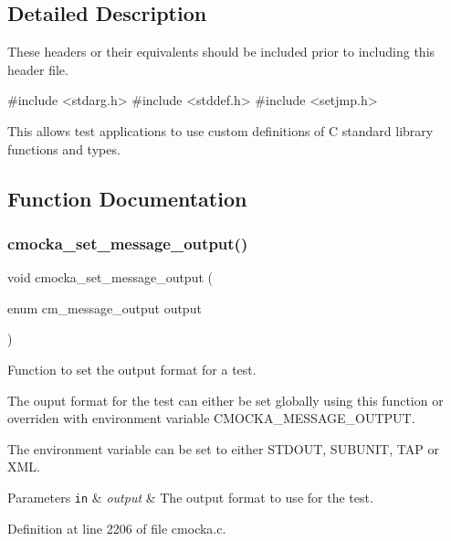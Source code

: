 \subsection{Detailed Description}
These headers or their equivalents should be included prior to including this header file. 
\begin{DoxyCode}
\textcolor{preprocessor}{#include <stdarg.h>}
\textcolor{preprocessor}{#include <stddef.h>}
\textcolor{preprocessor}{#include <setjmp.h>}
\end{DoxyCode}


This allows test applications to use custom definitions of C standard library functions and types. 

\subsection{Function Documentation}
\mbox{\label{group__cmocka_gae3764f4f38d067fe9c5faf034c07debd}} 
\subsubsection{\texorpdfstring{cmocka\+\_\+set\+\_\+message\+\_\+output()}{cmocka\_set\_message\_output()}}
{\footnotesize\ttfamily void cmocka\+\_\+set\+\_\+message\+\_\+output (\begin{DoxyParamCaption}\item[{enum cm\+\_\+message\+\_\+output}]{output }\end{DoxyParamCaption})}



Function to set the output format for a test. 

The ouput format for the test can either be set globally using this function or overriden with environment variable C\+M\+O\+C\+K\+A\+\_\+\+M\+E\+S\+S\+A\+G\+E\+\_\+\+O\+U\+T\+P\+UT.

The environment variable can be set to either S\+T\+D\+O\+UT, S\+U\+B\+U\+N\+IT, T\+AP or X\+ML.


\begin{DoxyParams}[1]{Parameters}
\mbox{\tt in}  & {\em output} & The output format to use for the test. \\
\hline
\end{DoxyParams}


Definition at line 2206 of file cmocka.\+c.

